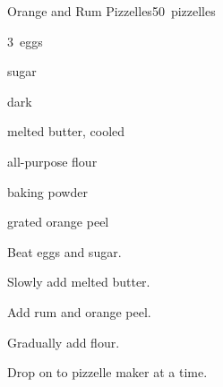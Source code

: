 \begin{recipe}{Orange and Rum Pizzelles}{}{50~pizzelles}

\begin{ingredients}
\item 3~eggs
\item {} sugar
\item {} dark 
\item \C{\half} melted butter, cooled
\item {} all-purpose flour
\item {} baking powder
\item {} grated orange peel
\end{ingredients}

\begin{directions}
\item Beat eggs and sugar.
\item Slowly add melted butter.
\item Add rum and orange peel.
\item Gradually add flour.
\item Drop on to pizzelle maker  at a time.
\end{directions}

\end{recipe}
